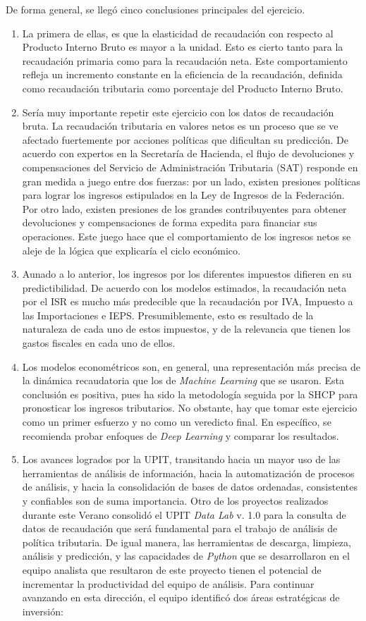 \documentclass[a4paper, 11pt]{article}
\begin{document}
De forma general, se llegó cinco conclusiones principales del ejercicio.
\begin{enumerate}
	\item La primera de ellas, es que la elasticidad de recaudación con respecto al Producto Interno Bruto es mayor a la unidad. Esto es cierto tanto para la recaudación primaria como para la recaudación neta. Este comportamiento refleja un incremento constante en la eficiencia de la recaudación, definida como recaudación tributaria como porcentaje del Producto Interno Bruto.
	\item Sería muy importante repetir este ejercicio con los datos de recaudación bruta. La recaudación tributaria en valores netos es un proceso que se ve afectado fuertemente por acciones políticas que dificultan su predicción. De acuerdo con expertos en la Secretaría de Hacienda, el flujo de devoluciones y compensaciones del Servicio de Administración Tributaria (SAT) responde en gran medida a juego entre dos fuerzas: por un lado, existen presiones políticas para lograr los ingresos estipulados en la Ley de Ingresos de la Federación. Por otro lado, existen presiones de los grandes contribuyentes para obtener devoluciones y compensaciones de forma expedita para financiar sus operaciones. Este juego hace que el comportamiento de los ingresos netos se aleje de la lógica que explicaría el ciclo económico. 
	\item Aunado a lo anterior, los ingresos por los diferentes impuestos difieren en su predictibilidad. De acuerdo con los modelos estimados, la recaudación neta por el ISR es mucho más predecible que la recaudación por IVA, Impuesto a las Importaciones e IEPS. Presumiblemente, esto es resultado de la naturaleza de cada uno de estos impuestos, y de la relevancia que tienen los gastos fiscales en cada uno de ellos.
	\item Los modelos econométricos son, en general, una representación más precisa de la dinámica recaudatoria que los de \textit{Machine Learning} que se usaron. Esta conclusión es positiva, pues ha sido la metodología seguida por la SHCP para pronosticar los ingresos tributarios. No obstante, hay que tomar este ejercicio como un primer esfuerzo y no como un veredicto final. En específico, se recomienda probar enfoques de \textit{Deep Learning} y comparar los resultados. 
	\item Los avances logrados por la UPIT, transitando hacia un mayor uso de las herramientas de análisis de información, hacia la automatización de procesos de análisis, y hacia la consolidación de bases de datos ordenadas, consistentes y confiables son de suma importancia. Otro de los proyectos realizados durante este Verano consolidó el UPIT \textit{Data Lab} v. 1.0 para la consulta de datos de recaudación que será fundamental para el trabajo de análisis de política tributaria. De igual manera, las herramientas de descarga, limpieza, análisis y predicción, y las capacidades de \textit{Python} que se desarrollaron en el equipo analista que resultaron de este proyecto tienen el potencial de incrementar la productividad del equipo de análisis. Para continuar avanzando en esta dirección, el equipo identificó dos áreas estratégicas de inversión:

\end{enumerate}
\end{document}
